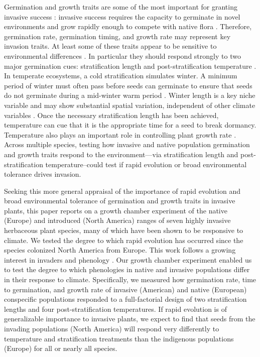 \documentclass[12pt]{article}\usepackage[]{graphicx}\usepackage[]{color}
\begin{document}
	Germination and growth traits are some of the most important for granting invasive success \parencite{Sattin1997, Maillet2000}: invasive success requires the capacity to germinate in novel environments and grow rapidly enough to compete with native flora \parencite{Grime1988}. Therefore, germination rate, germination timing, and growth rate may represent key invasion traits. At least some of these traits appear to be sensitive to environmental differences \parencite{Leger2007}.  In particular they should respond strongly to two major germination cues: stratification length and post-stratification temperature \parencite{Finch2006}. In temperate ecosystems, a cold stratification simulates winter. A minimum period of winter must often pass before seeds can germinate to ensure that seeds do not germinate during a mid-winter warm period \parencite{Baskin1998,Popay1970,Wulff1994}. Winter length is a key niche variable \parencite{Harte2015} and may show substantial spatial variation, independent of other climate variables \parencite{Bonan2003}.  Once the necessary stratification length has been achieved, temperature can cue that it is the appropriate time for a seed to break dormancy. Temperature also plays an important role in controlling plant growth rate \parencite{Egli1980,Guilioni2003}. Across multiple species, testing how invasive and native population germination and growth traits respond to the environment---via stratification length and post-stratification temperature--could test if rapid evolution or broad environmental tolerance drives invasion. 

	Seeking this more general appraisal of the importance of rapid evolution and broad environmental tolerance of germination and growth traits in invasive plants, this paper reports on a growth chamber experiment of the native (Europe) and introduced (North America) ranges of seven highly invasive herbaceous plant species, many of which have been shown to be responsive to climate. We tested the degree to which rapid evolution has occurred since the species colonized North America from Europe.  This work follows a growing interest in invaders and phenology \parencite[e.g.,][]{Seabloom:2003mg,Wolkovich2014}. Our growth chamber experiment enabled us to test the degree to which phenologies in native and invasive populations differ in their response to climate.  Specifically, we measured how germination rate, time to germination, and growth rate of invasive (American) and native (European) conspecific populations responded to a full-factorial design of two stratification lengths and four post-stratification temperatures. If rapid evolution is of generalizable importance to invasive plants, we expect to find that seeds from the invading populations (North America) will respond very differently to temperature and stratification treatments than the indigenous populations (Europe) for all or nearly all species. 
\end{document}
